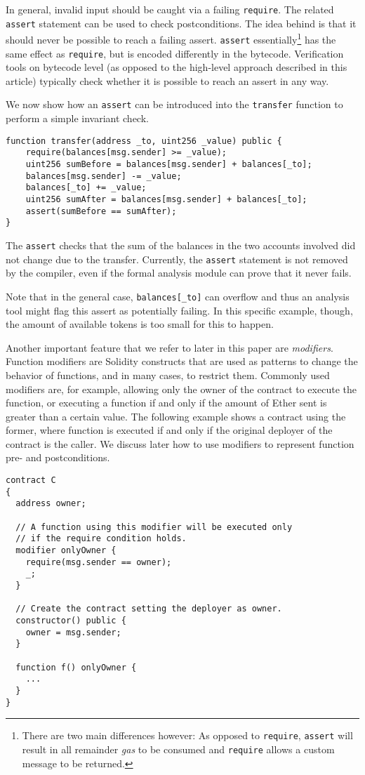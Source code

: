In general, invalid input should be caught via a failing \texttt{require}.
The related \texttt{assert} statement can be used to check postconditions.
The idea behind is that it should never be possible to reach a failing
assert.
\texttt{assert} essentially\footnote{There are two main differences however: As opposed to \texttt{require},
\texttt{assert} will result in all remainder \emph{gas} to be consumed and \texttt{require} allows a custom message to be returned.}
has the same effect as \texttt{require}, but
is encoded differently in the bytecode. Verification tools on bytecode
level (as opposed to the high-level approach described in this article)
typically check whether it is possible to reach an assert in any way.

We now show how an \texttt{assert} can be introduced into the \texttt{transfer} function
to perform a simple invariant check.
\begin{verbatim}
function transfer(address _to, uint256 _value) public {
    require(balances[msg.sender] >= _value);
    uint256 sumBefore = balances[msg.sender] + balances[_to];
    balances[msg.sender] -= _value;
    balances[_to] += _value;
    uint256 sumAfter = balances[msg.sender] + balances[_to];
    assert(sumBefore == sumAfter);
}
\end{verbatim}

The \texttt{assert} checks that the sum of the balances in the two
accounts involved did not change due to the transfer. Currently,
the \texttt{assert} statement is not removed by the compiler, even
if the formal analysis module can prove that it never fails.

Note that in the general case, \verb+balances[_to]+ can overflow
and thus an analysis tool might flag this assert as potentially
failing. In this specific example, though, the amount of available tokens
is too small for this to happen.

Another important feature that we refer to later in this paper are
\emph{modifiers}.
%
Function modifiers are Solidity constructs that are used as patterns to
change the behavior of functions, and in many cases, to restrict them.
%
Commonly used modifiers are, for example, allowing only the owner of the
contract to execute the function, or executing a function if and only if the
amount of Ether sent is greater than a certain value.
%
The following example shows a contract using the former, where function
 is executed if and only if the original deployer of the contract is
the caller.
%
We discuss later how to use modifiers to represent function pre- and
postconditions.

\begin{verbatim}
contract C
{
  address owner;

  // A function using this modifier will be executed only
  // if the require condition holds.
  modifier onlyOwner {
    require(msg.sender == owner);
    _;
  }

  // Create the contract setting the deployer as owner.
  constructor() public {
    owner = msg.sender;
  }

  function f() onlyOwner {
    ...
  }
}
\end{verbatim}
